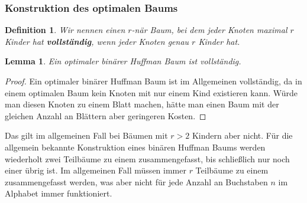 \documentclass[a4paper,10pt,ngerman]{scrartcl}
\newtheorem{definition}[satz]{Definition}
\newtheorem{lemma}[satz]{Lemma}
\begin{document}
    \subsubsection{Konstruktion des optimalen Baums}
    \begin{definition}
        Wir nennen einen $r$-när Baum, bei dem jeder Knoten maximal $r$ Kinder hat \textbf{vollständig}, wenn jeder Knoten genau $r$ Kinder hat.
    \end{definition}
    \begin{lemma}
        Ein optimaler binärer Huffman Baum ist vollständig.
    \end{lemma}
    \begin{proof}
        Ein optimaler binärer Huffman Baum ist im Allgemeinen vollständig, da in einem optimalen Baum kein Knoten mit nur einem Kind existieren kann.
        Würde man diesen Knoten zu einem Blatt machen, hätte man einen Baum mit der gleichen Anzahl an Blättern aber geringeren Kosten.
    \end{proof}
    Das gilt im allgemeinen Fall bei Bäumen mit $r > 2$ Kindern aber nicht.
    Für die allgemein bekannte Konstruktion eines binären Huffman Baums werden wiederholt zwei Teilbäume zu einem zusammengefasst, bis schließlich nur noch einer übrig ist.
    Im allgemeinen Fall müssen immer $r$ Teilbäume zu einem zusammengefasst werden, was aber nicht für jede Anzahl an Buchstaben $n$ im Alphabet immer funktioniert.
\end{document}
